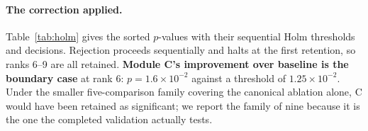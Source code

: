 \documentclass[preprint,11pt]{elsarticle}
\begin{document}
\paragraph{The correction applied.} Table~\ref{tab:holm} gives the
sorted $p$-values with their sequential Holm thresholds and decisions.
Rejection proceeds sequentially and halts at the first retention, so
ranks 6--9 are all retained. \textbf{Module C's improvement over baseline
is the boundary case} at rank 6: $p=1.6\times10^{-2}$ against a threshold
of $1.25\times10^{-2}$. Under the smaller five-comparison family covering
the canonical ablation alone, C would have been retained as significant;
we report the family of nine because it is the one the completed
validation actually tests.

\begin{table}[h]
\centering\small
\caption{Holm--Bonferroni correction across the pre-declared confirmatory
family of nine, $\alpha=0.05$. Rejection proceeds sequentially and halts
at the first retention, so ranks 6--9 are all retained. Module C's
improvement over baseline (rank 6) is the boundary case.}
\label{tab:holm}
\end{table}
\end{document}
